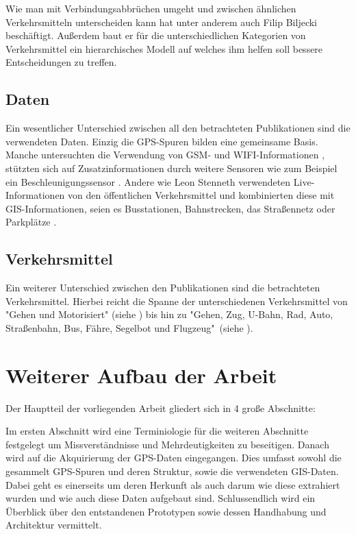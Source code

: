 Wie man mit Verbindungsabbrüchen umgeht und zwischen ähnlichen Verkehrsmitteln unterscheiden kann hat unter anderem auch Filip Biljecki beschäftigt. Außerdem baut er für die unterschiedlichen Kategorien von Verkehrsmittel ein hierarchisches Modell auf welches ihm helfen soll bessere Entscheidungen zu treffen. \cite{biljecki_transportation_2013}

\subsection{Daten}
Ein wesentlicher Unterschied zwischen all den betrachteten Publikationen sind die verwendeten Daten. Einzig die GPS-Spuren bilden eine gemeinsame Basis. Manche untersuchten die Verwendung von GSM- und WIFI-Informationen \cite{reddy_using_2010},  stützten sich auf Zusatzinformationen durch weitere Sensoren wie zum Beispiel ein Beschleunigungssensor \cite{reddy_using_2010, nadine_schussler_improving_2011}. Andere wie Leon Stenneth verwendeten Live-Informationen von den öffentlichen Verkehrsmittel und kombinierten diese mit GIS-Informationen, seien es Busstationen, Bahnstrecken, das Straßennetz oder Parkplätze \cite{stenneth_transportation_2011}.

\subsection{Verkehrsmittel}
Ein weiterer Unterschied zwischen den Publikationen sind die betrachteten Verkehrsmittel. Hierbei reicht die Spanne der unterschiedenen Verkehrsmittel von "Gehen und Motorisiert" (siehe \cite{reddy_using_2010}) bis hin zu "Gehen, Zug, U-Bahn, Rad, Auto, Straßenbahn, Bus, Fähre, Segelbot und Flugzeug"\ (siehe \cite{biljecki_transportation_2013}).

\section{Weiterer Aufbau der Arbeit}
Der Hauptteil der vorliegenden Arbeit gliedert sich in 4 große Abschnitte:

Im ersten Abschnitt wird eine Terminiologie für die weiteren Abschnitte festgelegt um Missverständnisse und Mehrdeutigkeiten zu beseitigen. Danach wird auf die Akquirierung der GPS-Daten eingegangen. Dies umfasst sowohl die gesammelt GPS-Spuren und deren Struktur, sowie die verwendeten GIS-Daten. Dabei geht es einerseits um deren Herkunft als auch darum wie diese extrahiert wurden und wie auch diese Daten aufgebaut sind. Schlussendlich wird ein Überblick über den entstandenen Prototypen sowie dessen Handhabung und Architektur vermittelt. 

